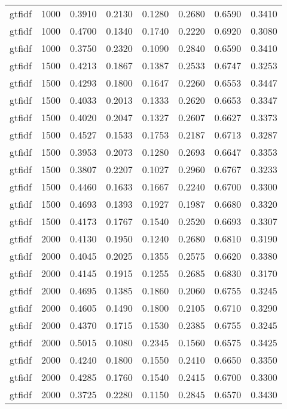 \begin{scriptsize}
\begin{longtable}{cccccccc}
	gtfidf   & 1000 & 0.3910 & 0.2130 & 0.1280 & 0.2680 & 0.6590 & 0.3410 \\
	gtfidf   & 1000 & 0.4700 & 0.1340 & 0.1740 & 0.2220 & 0.6920 & 0.3080 \\
	gtfidf   & 1000 & 0.3750 & 0.2320 & 0.1090 & 0.2840 & 0.6590 & 0.3410 \\
	gtfidf   & 1500 & 0.4213 & 0.1867 & 0.1387 & 0.2533 & 0.6747 & 0.3253 \\
	gtfidf   & 1500 & 0.4293 & 0.1800 & 0.1647 & 0.2260 & 0.6553 & 0.3447 \\
	gtfidf   & 1500 & 0.4033 & 0.2013 & 0.1333 & 0.2620 & 0.6653 & 0.3347 \\
	gtfidf   & 1500 & 0.4020 & 0.2047 & 0.1327 & 0.2607 & 0.6627 & 0.3373 \\
	gtfidf   & 1500 & 0.4527 & 0.1533 & 0.1753 & 0.2187 & 0.6713 & 0.3287 \\
	gtfidf   & 1500 & 0.3953 & 0.2073 & 0.1280 & 0.2693 & 0.6647 & 0.3353 \\
	gtfidf   & 1500 & 0.3807 & 0.2207 & 0.1027 & 0.2960 & 0.6767 & 0.3233 \\
	gtfidf   & 1500 & 0.4460 & 0.1633 & 0.1667 & 0.2240 & 0.6700 & 0.3300 \\
	gtfidf   & 1500 & 0.4693 & 0.1393 & 0.1927 & 0.1987 & 0.6680 & 0.3320 \\
	gtfidf   & 1500 & 0.4173 & 0.1767 & 0.1540 & 0.2520 & 0.6693 & 0.3307 \\
	gtfidf   & 2000 & 0.4130 & 0.1950 & 0.1240 & 0.2680 & 0.6810 & 0.3190 \\
	gtfidf   & 2000 & 0.4045 & 0.2025 & 0.1355 & 0.2575 & 0.6620 & 0.3380 \\
	gtfidf   & 2000 & 0.4145 & 0.1915 & 0.1255 & 0.2685 & 0.6830 & 0.3170 \\
	gtfidf   & 2000 & 0.4695 & 0.1385 & 0.1860 & 0.2060 & 0.6755 & 0.3245 \\
	gtfidf   & 2000 & 0.4605 & 0.1490 & 0.1800 & 0.2105 & 0.6710 & 0.3290 \\
	gtfidf   & 2000 & 0.4370 & 0.1715 & 0.1530 & 0.2385 & 0.6755 & 0.3245 \\
	gtfidf   & 2000 & 0.5015 & 0.1080 & 0.2345 & 0.1560 & 0.6575 & 0.3425 \\
	gtfidf   & 2000 & 0.4240 & 0.1800 & 0.1550 & 0.2410 & 0.6650 & 0.3350 \\
	gtfidf   & 2000 & 0.4285 & 0.1760 & 0.1540 & 0.2415 & 0.6700 & 0.3300 \\
	gtfidf   & 2000 & 0.3725 & 0.2280 & 0.1150 & 0.2845 & 0.6570 & 0.3430 \\

\end{longtable}
\end{scriptsize}
